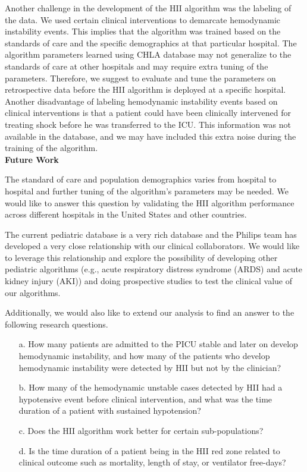 \documentclass[
   technote
]{phildoc}
\newcommand{\eg}{e.g.,}
\newcommand{\hii}{HII}
\begin{document}
Another challenge in the development of the \hii{} algorithm was the labeling of the data. We used certain clinical interventions to demarcate hemodynamic instability events. This implies that the algorithm was trained based on the standards of care and the specific demographics at that particular hospital. The algorithm parameters learned using CHLA database may not generalize to the standards of care at other hospitals and may require extra tuning of the parameters. Therefore, we suggest to evaluate and tune the parameters on retrospective data before the \hii{} algorithm is deployed at a specific hospital. Another disadvantage of labeling hemodynamic instability events based on clinical interventions is that a patient could have been clinically intervened for treating shock before he was transferred to the ICU. This information was not available in the database, and we may have included this extra noise during the training of the algorithm. \\      

\noindent\textbf{Future Work}

The standard of care and population demographics varies from hospital to hospital and further tuning of the algorithm's parameters may be needed. We would like to answer this question by validating the \hii{} algorithm performance across different hospitals in the United States and other countries. 

The current pediatric database is a very rich database and the Philips team has developed a very close relationship with our clinical collaborators. We would like to leverage this relationship and explore the possibility of developing other pediatric algorithms (\eg{} acute respiratory distress syndrome (ARDS) and acute kidney injury (AKI)) and doing prospective studies to test the clinical value of our algorithms.  

Additionally, we would also like to extend our analysis to find an answer to the following research questions. 

\begin{itemize}
\item[a.] How many patients are admitted to the PICU stable and later on develop hemodynamic instability, and how many of the patients who develop hemodynamic instability were detected by \hii{} but not by the clinician?

\item[b.] How many of the hemodynamic unstable cases detected by \hii{} had a hypotensive event before clinical intervention, and what was the time duration of a patient with sustained hypotension? 

\item[c.] Does the \hii{} algorithm work better for certain sub-populations?

\item[d.] Is the time duration of a patient being in the \hii{} red zone related to clinical outcome such as mortality, length of stay, or ventilator  free-days?
\end{itemize}
\end{document}
